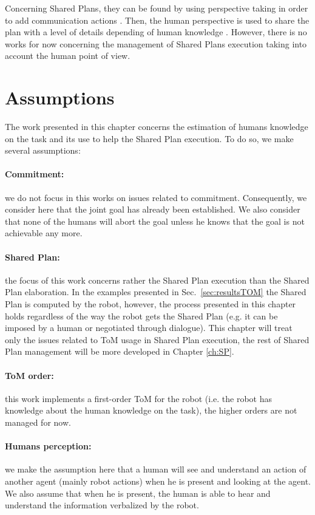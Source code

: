 \documentclass[english,a4paper,11pt,twoside]{StyleThese}
\begin{document}
Concerning Shared Plans, they can be found by using perspective taking in order to add communication actions \cite{guitton2012belief}. Then, the human perspective is used to share the plan with a level of details depending of human knowledge \cite{milliez2016using}. However, there is no works for now concerning the management of Shared Plans execution taking into account the human point of view. 

\section{Assumptions}


The work presented in this chapter concerns the estimation of humans knowledge on the task and its use to help the Shared Plan execution. To do so, we make several  assumptions:

\paragraph{Commitment:} we do not focus in this works on issues related to commitment. Consequently, we consider here that the joint goal has already been established. We also consider that none of the humans will abort the goal unless he knows that the goal is not achievable any more.

\paragraph{Shared Plan:} the focus of this work concerns rather the Shared Plan execution than the Shared Plan elaboration. In the examples presented in Sec.~\ref{sec:resultsTOM} the Shared Plan is computed by the robot, however, the process presented in this chapter holds regardless of the way the robot gets the Shared Plan (e.g. it can be imposed by a human or negotiated through dialogue). This chapter will treat only the issues related to ToM usage in Shared Plan execution, the rest of Shared Plan management will be more developed in Chapter \ref{ch:SP}.

\paragraph{ToM order:} this work implements a first-order ToM for the robot (i.e. the robot has knowledge about the human knowledge on the task), the higher orders are not managed for now.

\paragraph{Humans perception:} we make the assumption here that a human will see and understand an action of another agent (mainly robot actions) when he is present and looking at the agent. We
also assume that when he is present, the human is able to hear and understand the information verbalized by the robot.
\end{document}
